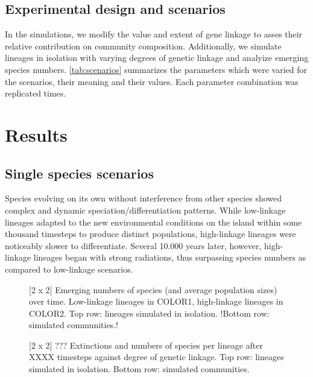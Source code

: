 \documentclass[a4paper]{scrartcl}
\begin{document}
\subsection{Experimental design and scenarios}
In the simulations, we modify the value and extent of
gene linkage
to asses their relative contribution on community composition.
Additionally, we simulate lineages in isolation with varying degrees of genetic linkage
and analyize emerging species numbers.
\cref{tab:scenarios} summarizes the parameters which were varied for the scenarios, their meaning and their values. %
Each parameter combination was replicated %
times.%

\section{Results}

\subsection{Single species scenarios}
Species evolving on its own without interference from other species showed complex and dynamic speciation/differentiation patterns.
While low-linkage lineages adapted to the new environmental conditions on the island within some thousand timesteps to produce distinct populations,
high-linkage lineages were noticeably slower to differentiate.
Several 10.000 years later, however, high-linkage lineages began with strong radiations, thus surpassing species numbers as compared to low-linkage scenarios.

\begin{figure}
  \caption{[2 x 2]
    Emerging numbers of species (and average population sizes) over time.
    Low-linkage lineages in COLOR1, high-linkage lineages in COLOR2.
    Top row: lineages simulated in isolation.
    !Bottom row: simulated communities.!}
  \label{specieslinkage}
\end{figure}

\begin{figure}
  \caption{[2 x 2]
    ???
    Extinctions and numbers of species per lineage after XXXX timesteps against degree of genetic linkage.
    Top row: lineages simulated in isolation.
    Bottom row: simulated communities.}
  \label{specieslinkage}
\end{figure}
\end{document}
